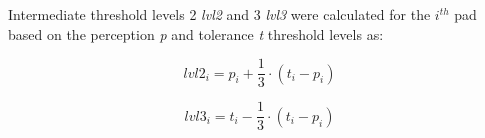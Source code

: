 Intermediate threshold levels 2 \textit{lvl2} and 3 \textit{lvl3} were calculated for the $i^{th}$ pad based on the perception \textit{p} and tolerance \textit{t} threshold levels as: 

\begin{equation}
lvl2_i = p_i + \frac{1}{3} \cdot (t_i - p_i)
\end{equation}

\begin{equation}
lvl3_i = t_i - \frac{1}{3} \cdot (t_i - p_i)
\end{equation}

       
